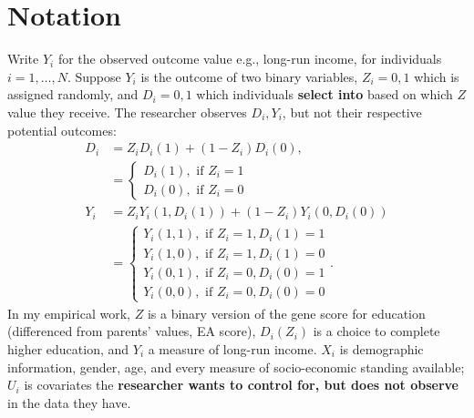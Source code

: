 \documentclass[a4paper, 12pt]{article}                                     %
\renewcommand{\vec}[1]{\boldsymbol{\mathit{#1}}}                           %
\begin{document}
\section{Notation}
Write $Y_i$ for the observed outcome value e.g., long-run income, for individuals $i = 1, \dots, N$.
Suppose $Y_i$ is the outcome of two binary variables, $Z_i = 0,1$ which is assigned randomly, and $D_i = 0,1$ which individuals \textbf{select into} based on which $Z$ value they receive.
The researcher observes $D_i, Y_i$, but not their respective potential outcomes:
\begin{align*}
    D_i &= Z_i       D_i(1)
        + (1 - Z_i) D_i(0), \\
        &= \begin{cases}
            D_i(1), \text{ if } Z_i = 1 \\
            D_i(0), \text{ if } Z_i = 0
        \end{cases}  \\
    Y_i &= Z_i      Y_i(1, D_i(1))
        + (1 - Z_i) Y_i(0, D_i(0)) \\
        &= \begin{cases}
            Y_i(1, 1), \text{ if } Z_i = 1, D_i(1) = 1 \\
            Y_i(1, 0), \text{ if } Z_i = 1, D_i(1) = 0 \\
            Y_i(0, 1), \text{ if } Z_i = 0, D_i(0) = 1 \\
            Y_i(0, 0), \text{ if } Z_i = 0, D_i(0) = 0
        \end{cases}.
\end{align*}
In my empirical work, $Z$ is a binary version of the gene score for education (differenced from parents' values, EA score), $D_i(Z_i)$ is a choice to complete higher education, and $Y_i$ a measure of long-run income.
$\vec X_i$ is demographic information, gender, age, and every measure of socio-economic standing available; $U_i$ is covariates the \textbf{researcher wants to control for, but does not observe} in the data they have.
\end{document}
